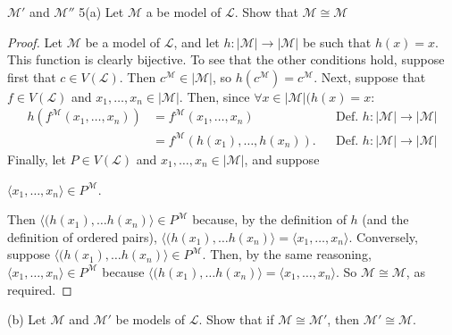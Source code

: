 \documentclass{article}
\begin{document}
$\mathcal{M'}$ and $\mathcal{M''}$ 
5(a) Let $\mathcal{M}$ a  be model of $\mathscr{L}$. Show that $\mathcal{M} \cong \mathcal{M}$ 
\begin{proof} 
Let $\mathcal{M}$ be a model of $\mathscr{L}$, and let $h: | \mathcal{M} | \rightarrow | \mathcal{M} |$ be such that $h(x) = x$. This function is clearly bijective. To see that the other conditions hold, suppose first that $c \in V(\mathscr{L})$. Then $c^\mathcal{M} \in | \mathcal{M} |$, so $h(c^\mathcal{M}) = c^\mathcal{M}$. Next, suppose that $f \in V(\mathscr{L})$ and  $x_1, \ldots, x_n \in | \mathcal{M}|$. Then, since $\forall x \in |\mathcal{M}| (h(x) = x$:
 \begin{align*} 
 h(f^\mathcal{M}(x_1, \ldots, x_n)) &= f^\mathcal{M}(x_1, \ldots, x_n)&&\text{Def. $h: | \mathcal{M} | \rightarrow | \mathcal{M} |$}\\
 &= f^\mathcal{M}(h(x_1), \ldots,h(x_n)).&&\text{Def.  $h: | \mathcal{M} | \rightarrow | \mathcal{M} |$}
 \end{align*} Finally, let $P \in V(\mathscr{L})$ and $x_1, \ldots, x_n \in |\mathcal{M}|$, and suppose \begin{center} $\langle x_1,\ldots, x_n \rangle \in P^\mathcal{M}$. \end{center} Then $\langle (h(x_1), \ldots h(x_n) \rangle \in P^\mathcal{M}$ because, by the definition of $h$ (and the definition of ordered pairs), $\langle (h(x_1), \ldots h(x_n) \rangle  = \langle x_1,\ldots, x_n \rangle$. Conversely, suppose $\langle (h(x_1), \ldots h(x_n) \rangle \in P^\mathcal{M}$. Then, by the same reasoning, $\langle x_1,\ldots, x_n \rangle \in P^\mathcal{M}$ because $\langle (h(x_1), \ldots h(x_n) \rangle =  \langle x_1,\ldots, x_n \rangle$. So $\mathcal{M} \cong  \mathcal{M}$, as required.
\end{proof} (b) Let $\mathcal{M}$ and $\mathcal{M'}$  be models of $\mathscr{L}$. Show that if $\mathcal{M} \cong \mathcal{M'}$, then $\mathcal{M'} \cong \mathcal{M}$. 
\end{document}
